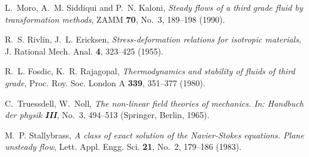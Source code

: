 \documentclass[twocolumn,showpacs,preprintnumbers,amsmath,amssymb]{revtex4}
\begin{document}
\begin{thebibliography}{10}
L.~Moro, A.~M. Siddiqui and P.~N. Kaloni, \emph{Steady flows of a
third grade fluid by transformation methods}, ZAMM \textbf{70},
No.~3, 189--198 (1990).

R.~S. Rivlin, J.~L. Ericksen, \emph{Stress-deformation relations for
isotropic materials}, J. Rational Mech. Anal. \textbf{4}, 323--425
(1955).

R.~L. Fosdic, K.~R. Rajagopal, \emph{Thermodynamics and stability of
fluids of third grade}, Proc. Roy. Soc. London A \textbf{339},
351--377 (1980).

C.~Truessdell, W.~Noll, \emph{The non-linear field theories of
mechanics. In: Handbuch der physik \textbf{III}}, No.~3, 494--513
(Springer, Berlin, 1965).

M.~P. Stallybrass, \emph{A class of exact solution of the
Navier-Stokes equations. Plane unsteady flow}, Lett. Appl. Engg.
Sci. \textbf{21}, No.~2, 179--186 (1983).
\end{thebibliography}
\end{document}
